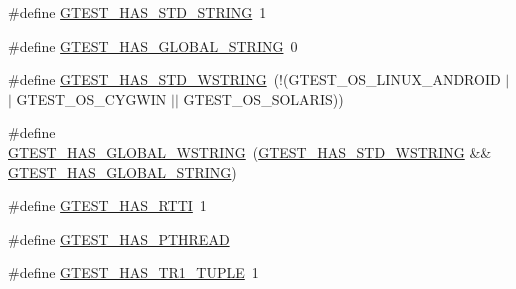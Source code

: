 \begin{DoxyCompactItemize}
\item 
\#define \mbox{\hyperlink{_obj__test_2lib_2googletest-release-1_88_81_2googletest_2include_2gtest_2internal_2gtest-port_8h_adba1121430c11cee8ba0c74e8cf6aa40}{G\+T\+E\+S\+T\+\_\+\+H\+A\+S\+\_\+\+S\+T\+D\+\_\+\+S\+T\+R\+I\+NG}}~1
\item 
\#define \mbox{\hyperlink{_obj__test_2lib_2googletest-release-1_88_81_2googletest_2include_2gtest_2internal_2gtest-port_8h_a6ab57c4a17233dd4ed30c2926bb99cc5}{G\+T\+E\+S\+T\+\_\+\+H\+A\+S\+\_\+\+G\+L\+O\+B\+A\+L\+\_\+\+S\+T\+R\+I\+NG}}~0
\item 
\#define \mbox{\hyperlink{_obj__test_2lib_2googletest-release-1_88_81_2googletest_2include_2gtest_2internal_2gtest-port_8h_a6e087748d8bbd2ca57c487b6ad268670}{G\+T\+E\+S\+T\+\_\+\+H\+A\+S\+\_\+\+S\+T\+D\+\_\+\+W\+S\+T\+R\+I\+NG}}~(!(G\+T\+E\+S\+T\+\_\+\+O\+S\+\_\+\+L\+I\+N\+U\+X\+\_\+\+A\+N\+D\+R\+O\+ID $\vert$$\vert$ G\+T\+E\+S\+T\+\_\+\+O\+S\+\_\+\+C\+Y\+G\+W\+IN $\vert$$\vert$ G\+T\+E\+S\+T\+\_\+\+O\+S\+\_\+\+S\+O\+L\+A\+R\+IS))
\item 
\#define \mbox{\hyperlink{_obj__test_2lib_2googletest-release-1_88_81_2googletest_2include_2gtest_2internal_2gtest-port_8h_afca9ecaf5846561187a15b75013aa85b}{G\+T\+E\+S\+T\+\_\+\+H\+A\+S\+\_\+\+G\+L\+O\+B\+A\+L\+\_\+\+W\+S\+T\+R\+I\+NG}}~(\mbox{\hyperlink{_obj__test_2lib_2googletest-release-1_88_81_2googletest_2include_2gtest_2internal_2gtest-port_8h_a6e087748d8bbd2ca57c487b6ad268670}{G\+T\+E\+S\+T\+\_\+\+H\+A\+S\+\_\+\+S\+T\+D\+\_\+\+W\+S\+T\+R\+I\+NG}} \&\& \mbox{\hyperlink{_obj__test_2lib_2googletest-release-1_88_81_2googletest_2include_2gtest_2internal_2gtest-port_8h_a6ab57c4a17233dd4ed30c2926bb99cc5}{G\+T\+E\+S\+T\+\_\+\+H\+A\+S\+\_\+\+G\+L\+O\+B\+A\+L\+\_\+\+S\+T\+R\+I\+NG}})
\item 
\#define \mbox{\hyperlink{_obj__test_2lib_2googletest-release-1_88_81_2googletest_2include_2gtest_2internal_2gtest-port_8h_a9ba781217167f905bff2f1c410a97930}{G\+T\+E\+S\+T\+\_\+\+H\+A\+S\+\_\+\+R\+T\+TI}}~1
\item 
\#define \mbox{\hyperlink{_obj__test_2lib_2googletest-release-1_88_81_2googletest_2include_2gtest_2internal_2gtest-port_8h_a3341397e1952de0b9cd88762d4d3ae4b}{G\+T\+E\+S\+T\+\_\+\+H\+A\+S\+\_\+\+P\+T\+H\+R\+E\+AD}}
\item 
\#define \mbox{\hyperlink{_obj__test_2lib_2googletest-release-1_88_81_2googletest_2include_2gtest_2internal_2gtest-port_8h_a6de49dd4cbae1db15dc6edca3b179d1b}{G\+T\+E\+S\+T\+\_\+\+H\+A\+S\+\_\+\+T\+R1\+\_\+\+T\+U\+P\+LE}}~1
\item 

\end{DoxyCompactItemize}
